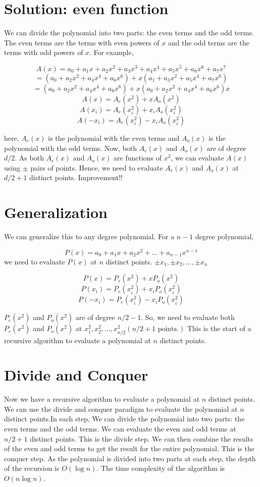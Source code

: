 \documentclass[28]{report}
\begin{document}
\section{Solution: even function}
We can divide the polynomial into two parts: the even terms and the odd terms. The even terms are the terms with even powers of \(x\) and the odd terms are the terms with odd powers of \(x\). For example, 



    
	$$A(x) = a_0 + a_1x + a_2x^2 + a_3x^3 + a_4x^4 + a_5x^5 + a_6x^6 + a_7x^7$$
	$$ = (a_0 + a_2x^2 + a_4x^4 + a_6x^6) + x(a_1 + a_3x^2 + a_5x^4 + a_7x^6)$$
	$$ =  (a_0 + a_2x^2 + a_4x^4 + a_6x^6) + x(a_0 + a_2x^2 + a_4x^4 + a_6x^6)x $$
	$$A(x)= A_e(x^2) + xA_o(x^2)$$
	$$A(x_i) = A_e(x_i^2) + x_iA_o(x_i^2)$$
	$$A(-x_i) = A_e(x_i^2) - x_iA_o(x_i^2)$$

here, \(A_e(x)\) is the polynomial with the even terms and \(A_o(x)\) is the polynomial with the odd terms. Now, both \(A_e(x)\) and \(A_o(x)\) are of degree \(d/2\). 
As both \(A_e(x)\) and \(A_o(x)\) are functions of \(x^2\), we can evaluate \(A(x)\) using \(\pm\) pairs of points. Hence, we need to evaluate \(A_e(x)\) and \(A_o(x)\) at \(d/2 + 1\) distinct points. Improvement!!

\section{Generalization}
We can generalize this to any degree polynomial.
For a \(n-1\) degree polynomial, 

$$	P(x) = a_0 + a_1x + a_2x^2 + \ldots + a_{n-1}x^{n-1} $$
we need to evaluate \(P(x)\) at \(n\) distinct points. $\pm x_1,\pm x_2, \ldots, \pm x_n $

$$ P(x) = P_e(x^2) + xP_o(x^2)$$
$$ P(x_i) = P_e(x_i^2) + x_iP_o(x_i^2)$$
 $$P(-x_i) = P_e(x_i^2) - x_iP_o(x_i^2)$$

\(P_e(x^2)\) and \(P_o(x^2)\) are of degree \(n/2-1\).\newline
So, we need to evaluate both \(P_e(x^2)\) and \(P_o(x^2)\) at $ x_1^2, x_2^2, \ldots, x_{n/2}^2 (n/2 + 1 \text{ points.})$ \newline
This is the start of a recursive algorithm to evaluate a polynomial at \(n\) distinct points.

\section{Divide and Conquer}
Now we have a recursive algorithm to evaluate a polynomial at \(n\) distinct points. We can use the divide and conquer paradigm to evaluate the polynomial at \(n\) distinct points.In each step, We can divide the polynomial into two parts: the even terms and the odd terms. We can evaluate the even and odd terms at \(n/2 + 1\) distinct points. This is the divide step. We can then combine the results of the even and odd terms to get the result for the entire polynomial. This is the conquer step. As the polynomial is divided into two parts at each step, the depth of the recursion is \(O(\log n)\). The time complexity of the algorithm is \(O(n \log n)\).
\end{document}

